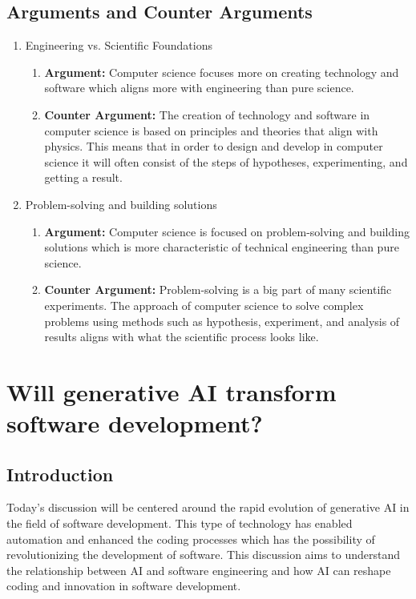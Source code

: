 \documentclass{article}
\begin{document}
\subsection{Arguments and Counter Arguments}
\begin{enumerate}
    \item Engineering vs. Scientific Foundations
    \begin{enumerate}
        \item \textbf{Argument:} Computer science focuses more on creating technology and software which aligns more with engineering than pure science.
        \item \textbf{Counter Argument:} The creation of technology and software in computer science is based on principles and theories that align with physics. This means that in order to design and develop in computer science it will often consist of the steps of hypotheses, experimenting, and getting a result.
    \end{enumerate}
    \item Problem-solving and building solutions
     \begin{enumerate}
        \item \textbf{Argument:} Computer science is focused on problem-solving and building solutions which is more characteristic of technical engineering than pure science.
        \item \textbf{Counter Argument:} Problem-solving is a big part of many scientific experiments. The approach of computer science to solve complex problems using methods such as hypothesis, experiment, and analysis of results aligns with what the scientific process looks like.
    \end{enumerate}
\end{enumerate}

\section{Will generative AI transform software development?}
\subsection{Introduction}
Today's discussion will be centered around the rapid evolution of generative AI in the field of software development. This type of technology has enabled automation and enhanced the coding processes which has the possibility of revolutionizing the development of software. This discussion aims to understand the relationship between AI and software engineering and how AI can reshape coding and innovation in software development.
\end{document}
